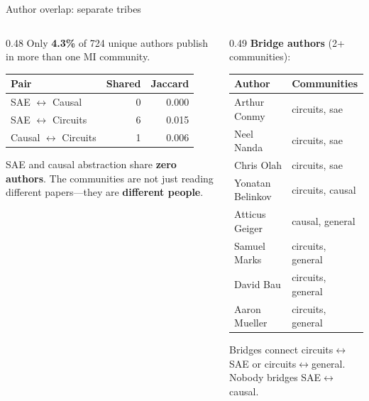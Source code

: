 \documentclass[aspectratio=169,11pt]{beamer}
\begin{document}
\begin{frame}[label=authoroverlap]{Author overlap: separate tribes}
\begin{columns}[T]
\begin{column}{0.48\textwidth}
{\small Only \textbf{4.3\%} of 724 unique authors publish in more than one MI community.}

\vspace{0.5em}
{\scriptsize
\begin{tabular}{lrr}
\toprule
\textbf{Pair} & \textbf{Shared} & \textbf{Jaccard} \\
\midrule
SAE $\leftrightarrow$ Causal & 0 & 0.000 \\
SAE $\leftrightarrow$ Circuits & 6 & 0.015 \\
Causal $\leftrightarrow$ Circuits & 1 & 0.006 \\
\bottomrule
\end{tabular}
}

\vspace{0.5em}
{\small SAE and causal abstraction share \textbf{zero authors}. The communities are not just reading different papers---they are \textbf{different people}.}
\end{column}
\begin{column}{0.49\textwidth}
\vspace{0.3em}
{\small \textbf{Bridge authors} (2+ communities):}

\vspace{0.3em}
{\scriptsize
\begin{tabular}{ll}
\toprule
\textbf{Author} & \textbf{Communities} \\
\midrule
Arthur Conmy & circuits, sae \\
Neel Nanda & circuits, sae \\
Chris Olah & circuits, sae \\
Yonatan Belinkov & circuits, causal \\
Atticus Geiger & causal, general \\
Samuel Marks & circuits, general \\
David Bau & circuits, general \\
Aaron Mueller & circuits, general \\
\bottomrule
\end{tabular}
}

\vspace{0.3em}
{\scriptsize Bridges connect circuits$\leftrightarrow$SAE or circuits$\leftrightarrow$general. Nobody bridges SAE$\leftrightarrow$causal.}
\end{column}
\end{columns}
\end{frame}
\end{document}
